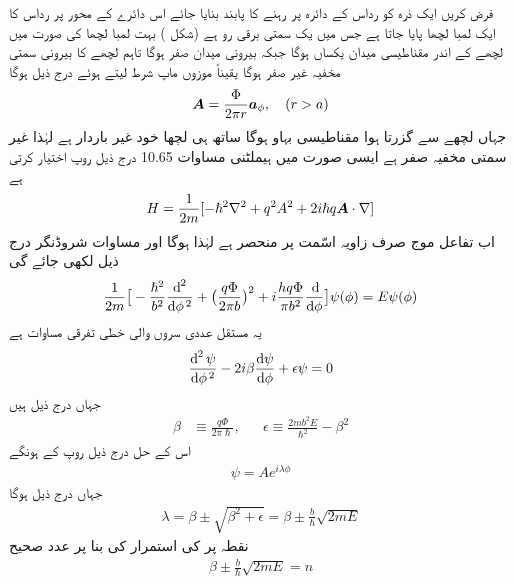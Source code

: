  فرض کریں ایک ذرہ کو رداس  کے دائرہ پر رہنے کا پابند بنایا جائے اس دائرے کے محور پر رداس  کا ایک لمبا لچھا پایا جاتا ہے جس میں یک سمتی برقی رو  ہے  (شکل  )   بہت لمبا لچھا کی صورت میں لچھے کے اندر مقناطیسی میدان یکساں ہوگا جبکہ بیرونی میدان صفر ہوگا تاہم لچھے کا بیرونی سمتی مخفیہ غیر صفر ہوگا یقیناً موزوں ماپ شرط  لیتے ہوئے درج ذیل ہوگا 
\begin{align}
{\ensuremath{{\boldsymbol{A}}}} = \frac{\Phi}{2\pi r} {\boldsymbol{a}}_{\phi}, \quad (r > a)
\end{align}
جہاں  لچھے سے گزرتا ہوا  مقناطیسی بہاو ہوگا ساتھ ہی لچھا خود غیر باردار ہے لہٰذا غیر سمتی مخفیہ  صفر ہے ایسی صورت میں ہیملٹنی مساوات  10.65 درج ذیل روپ اختیار کرتی ہے 
\begin{align}
H = \frac{1}{2m} [- \hslash^2 \nabla^2 + q^2 A^2 + 2 i \hslash q {{\boldsymbol{A}}} \cdot \nabla]
\end{align}
اب تفاعل موج صرف زاویہ اسّمت  پر منحصر ہے لہٰذا  ہوگا اور مساوات شروڈنگر درج ذیل لکھی جائے گی 
\begin{align}
\frac{1}{2m} \big [ - \frac{\hslash^2}{b^2} \frac{\dif^{\,2}}{\dif \phi^{\,2}} + \big ( \frac{q \Phi}{2 \pi b} \big )^2 + i \frac{h q \Phi}{\pi b^2} \frac{\dif}{\dif \phi} \big ] \psi (\phi) = E \psi (\phi)
\end{align}
یہ مستقل عددی سروں والی خطی تفرقی مساوات ہے
\begin{align}
\frac{\dif^{\,2} \psi}{\dif \phi^{\,2}} - 2i \beta \frac{\dif \psi}{\dif \phi} + \epsilon \psi = 0
\end{align}
جہاں درج ذیل ہیں
\begin{align}
\beta &\equiv \frac{q \Phi}{2 \pi \hslash}, && \epsilon \equiv \frac{2 m b ^2 E}{\hslash^2} - \beta^2
\end{align}
اس کے حل درج ذیل روپ کے ہونگے 
\begin{align}
\psi = Ae^{i \lambda \phi}
\end{align}
جہاں درج ذیل ہوگا 
\begin{align}
\lambda = \beta \pm \sqrt{ \beta^2 + \epsilon} = \beta \pm \frac{b}{\hslash} \sqrt{2 m E}
\end{align}
نقطہ  پر  کی استمرار کی بنا پر  عدد صحیح
\begin{align}
\beta \pm \frac{b}{\hslash} \sqrt{2m E} = n
\end{align} 
